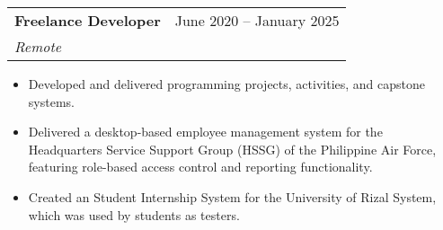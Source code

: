 \documentclass[legal,10pt]{article}
\makeatletter
\newcommand{\resumeItem}[1]{
  \item\small{
    {#1 \vspace{-2pt}}
  }
}
\newcommand{\resumeSubheading}[4]{
  \vspace{-2pt}\item
    \begin{tabular*}{0.97\textwidth}[t]{l@{\extracolsep{\fill}}r}
      \textbf{#1} & #2 \\
      \textit{\small#3} & \textit{\small #4} \\
    \end{tabular*}\vspace{-7pt}
}
\newcommand{\resumeSubSubheading}[2]{
    \item
    \begin{tabular*}{0.97\textwidth}{l@{\extracolsep{\fill}}r}
      \textit{\small#1} & \textit{\small #2} \\
    \end{tabular*}\vspace{-7pt}
}
\newcommand{\resumeSubHeadingListEnd}{\end{itemize}}
\newcommand{\resumeItemListStart}{\begin{itemize}}
\newcommand{\resumeItemListEnd}{\end{itemize}\vspace{-5pt}}
\makeatother
\begin{document}
    \resumeSubheading
      {Freelance Developer}{June 2020 -- January 2025}
      {Remote}{}
      \resumeItemListStart
        \resumeItem{Developed and delivered programming projects, activities, and capstone systems.}
        \resumeItem{Delivered a desktop-based employee management system for the Headquarters Service Support Group (HSSG) of the Philippine Air Force, featuring role-based access control and reporting functionality.}
        \resumeItem{Created an Student Internship System for the University of Rizal System, which was used by students as testers.}
      \resumeItemListEnd




    

    
\end{document}
